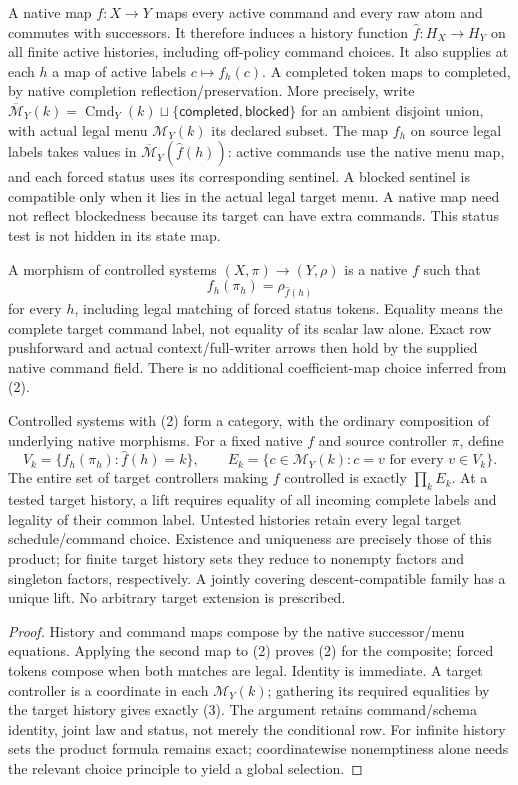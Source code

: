 \documentclass[11pt]{article}
\begin{document}
A native map $f:X\to Y$ maps every active command and every raw atom and commutes with successors. It therefore induces a history function $\widehat f:H_X\to H_Y$ on all finite active histories, including off-policy command choices. It also supplies at each $h$ a map of active labels $c\mapsto f_h(c)$. A completed token maps to completed, by native completion reflection/preservation. More precisely, write $\overline{\mathcal M}_Y(k)=\operatorname{Cmd}_Y(k)\sqcup\{\mathsf{completed},\mathsf{blocked}\}$ for an ambient disjoint union, with actual legal menu $\mathcal M_Y(k)$ its declared subset. The map $f_h$ on source legal labels takes values in $\overline{\mathcal M}_Y(\widehat f(h))$: active commands use the native menu map, and each forced status uses its corresponding sentinel. A blocked sentinel is compatible only when it lies in the actual legal target menu. A native map need not reflect blockedness because its target can have extra commands. This status test is not hidden in its state map.

A morphism of controlled systems $(X,\pi)\to(Y,\rho)$ is a native $f$ such that
\[
                    f_h(\pi_h)=\rho_{\widehat f(h)}       \tag{2}
\]
for every $h$, including legal matching of forced status tokens. Equality means the complete target command label, not equality of its scalar law alone. Exact row pushforward and actual context/full-writer arrows then hold by the supplied native command field. There is no additional coefficient-map choice inferred from (2).

\begin{theorem}
Controlled systems with (2) form a category, with the ordinary composition of underlying native morphisms. For a fixed native $f$ and source controller $\pi$, define
\[
 V_k=\{f_h(\pi_h):\widehat f(h)=k\},\qquad
 E_k=\{c\in\mathcal M_Y(k):c=v\text{ for every }v\in V_k\}. \tag{3}
\]
The entire set of target controllers making $f$ controlled is exactly $\prod_kE_k$. At a tested target history, a lift requires equality of all incoming complete labels and legality of their common label. Untested histories retain every legal target schedule/command choice. Existence and uniqueness are precisely those of this product; for finite target history sets they reduce to nonempty factors and singleton factors, respectively. A jointly covering descent-compatible family has a unique lift. No arbitrary target extension is prescribed.
\end{theorem}
\begin{proof}
History and command maps compose by the native successor/menu equations. Applying the second map to (2) proves (2) for the composite; forced tokens compose when both matches are legal. Identity is immediate. A target controller is a coordinate in each $\mathcal M_Y(k)$; gathering its required equalities by the target history gives exactly (3). The argument retains command/schema identity, joint law and status, not merely the conditional row. For infinite history sets the product formula remains exact; coordinatewise nonemptiness alone needs the relevant choice principle to yield a global selection.\end{proof}
\end{document}
